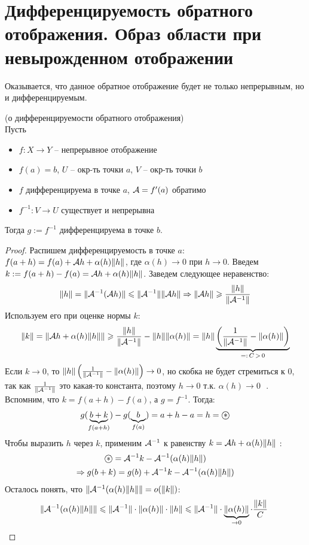 \section{Дифференцируемость обратного отображения. Образ области при невырожденном отображении}

Оказывается, что данное обратное отображение будет не только непрерывным, но и дифференцируемым.
\begin{theorem} (о дифференцируемости обратного отображения) \\
    Пусть \begin{itemize}
        \item $f: X \to Y$  -- непрерывное отображение
        \item $f(a) = b$, $U$ -- окр-ть точки $a$, $V$ -- окр-ть точки $b$
        \item $f$ дифференцируема в точке $a$, $\mathcal{A} = f'(a)$ обратимо
        \item $f^{-1}: V \to U$ существует и непрерывна
    \end{itemize}
    Тогда $g := f^{-1}$ дифференцируема в точке $b$.
\end{theorem}
\begin{proof}
    Распишем дифференцируемость в точке $a$: $f(a + h) = f(a) + \mathcal{A} h + \alpha(h)\| h \|$, где $\alpha(h) \to 0$ при $h \to 0$.
    Введем $k := f(a + h) - f(a) = \mathcal{A} h + \alpha(h)\| h \|$. 
    Заведем следующее неравенство: \[ \| h \| = \| \mathcal{A}^{-1}(\mathcal{A} h) \| \leqslant \| \mathcal{A}^{-1} \| \| \mathcal{A} h \| \Rightarrow \| \mathcal{A} h \| \geqslant \frac{\| h \|}{\| \mathcal{A}^{-1} \|} \]
    \quad Используем его при оценке нормы $k$: \[ \| k \| = \| \mathcal{A} h + \alpha(h)\| h \| \| \geqslant \frac{\| h \|}{\| \mathcal{A}^{-1} \|} - \| h \|\|\alpha(h) \| = \| h \| \underbrace{\left(\frac{1}{\| \mathcal{A}^{-1} \|} - \| \alpha(h) \| \right)}_{=:\, C \, > \, 0} \]
    \quad Если $k \to 0$, то $\| h \| \left(\frac{1}{\| \mathcal{A}^{-1} \|} - \| \alpha(h) \| \right) \to 0$, но скобка не будет стремиться к 0, так как $\frac{1}{\| \mathcal{A}^{-1} \|}$ это какая-то константа, поэтому $h \to 0 \text{ т.к. $\alpha(h) \to 0$ }$.
    Вспомним, что $k = f(a+h) - f(a)$, а $g = f^{-1}$. 
    \quad Тогда: \begin{gather*}
        g(\underbrace{b + k}_{f(a+h)}) - g(\underbrace{b}_{f(a)}) = a + h - a = h = \oast 
    \end{gather*}
    \quad Чтобы выразить $h$ через $k$, применим $\mathcal{A}^{-1}$ к равенству $k = \mathcal{A} h + \alpha(h)\| h \|$ : \begin{gather*}
        \oast = \A^{-1}k - \A^{-1}(\alpha(h) \| h \|) \\
        \Rightarrow g(b + k) = g(b) + \A^{-1}k - \A^{-1}(\alpha(h) \| h \|)
    \end{gather*}
    \quad Осталось понять, что $\| \mathcal{A}^{-1}(\alpha(h) \| h \| \| = o(\|k\|)$:
    \[ \| \A^{-1}(\alpha(h) \| h \| \| \leqslant \| \A^{-1} \| \cdot \|\alpha(h) \| \cdot \| h \| \leqslant \| \A^{-1} \| \cdot \underbrace{\|\alpha(h) \|}_{\to 0} \cdot \frac{\|k\|}{C}\  \]
\end{proof}

